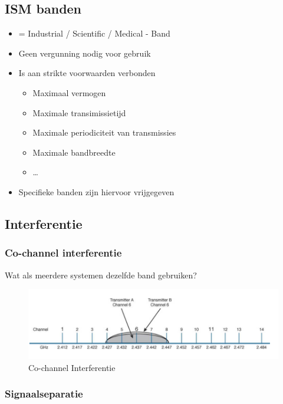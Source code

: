 \documentclass{article}
\begin{document}
\subsection{ISM banden}
\begin{itemize}
    \item = Industrial / Scientific / Medical - Band
    \item Geen vergunning nodig voor gebruik
    \item Is aan strikte voorwaarden verbonden
    \begin{itemize}
        \item Maximaal vermogen
        \item Maximale transimissietijd
        \item Maximale periodiciteit van transmissies
        \item Maximale bandbreedte
        \item \dots
    \end{itemize}
    \item Specifieke banden zijn hiervoor vrijgegeven
\end{itemize}

\subsection{Interferentie}

\subsubsection{Co-channel interferentie}
Wat als meerdere systemen dezelfde band gebruiken?

\begin{figure}[H]
    \centering
    \includegraphics[width=\textwidth]{Screenshot_20200309_115759.png}
    \caption{Co-channel Interferentie}
\end{figure}

\subsubsection{Signaalseparatie}
\end{document}
